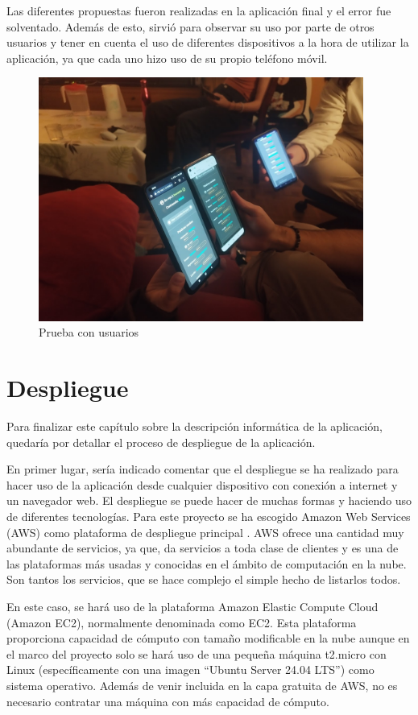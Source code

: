 Las diferentes propuestas fueron realizadas en la aplicación final y el error fue solventado. Además de esto, sirvió para observar su uso por parte de otros usuarios
y tener en cuenta el uso de diferentes dispositivos a la hora de utilizar la aplicación, ya que cada uno hizo uso de su propio teléfono móvil.

\begin{figure}[ht!]
	\centering
	\includegraphics[height=8cm,clip=true]{res_prueba.jpg}
	\caption{Prueba con usuarios}
	\label{fig:res_prueba}
\end{figure}




\section{Despliegue}

Para finalizar este capítulo sobre la descripción informática de la aplicación, quedaría por detallar el proceso de despliegue de la 
aplicación.

En primer lugar, sería indicado comentar que el despliegue se ha realizado para hacer uso de la aplicación desde cualquier dispositivo
con conexión a internet y un navegador web. El despliegue se puede hacer de muchas formas y haciendo uso de diferentes tecnologías. Para 
este proyecto se ha escogido Amazon Web Services (AWS) como plataforma de despliegue principal \cite{aws}. AWS ofrece una cantidad muy abundante
de servicios, ya que, da servicios a toda clase de clientes y es una de las plataformas más usadas y conocidas en el ámbito de 
computación en la nube. Son tantos los servicios, que se hace complejo el simple hecho de listarlos todos.

En este caso, se hará uso de la plataforma Amazon Elastic Compute Cloud (Amazon EC2), normalmente denominada como EC2. Esta plataforma
proporciona capacidad de cómputo con tamaño modificable en la nube aunque en el marco del proyecto solo se hará uso de una pequeña máquina
t2.micro con Linux (específicamente con una imagen ``Ubuntu Server 24.04 LTS'') como sistema operativo. Además de venir incluida en la capa gratuita de AWS, no es necesario contratar 
una máquina con más capacidad de cómputo. 

